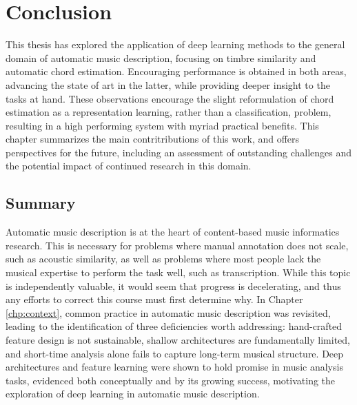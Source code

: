 \graphicspath{{8/figures/}}
\chapter{Conclusion}
\label{chp:conclusion}

This thesis has explored the application of deep learning methods to the general domain of automatic music description, focusing on timbre similarity and automatic chord estimation.
Encouraging performance is obtained in both areas, advancing the state of art in the latter, while providing deeper insight to the tasks at hand.
These observations encourage the slight reformulation of chord estimation as a representation learning, rather than a classification, problem, resulting in a high performing system with myriad practical benefits.
This chapter summarizes the main contritributions of this work, and offers perspectives for the future, including an assessment of outstanding challenges and the potential impact of continued research in this domain.

\section{Summary}

Automatic music description is at the heart of content-based music informatics research.
This is necessary for problems where manual annotation does not scale, such as acoustic similarity, as well as problems where most people lack the musical expertise to perform the task well, such as transcription.
While this topic is independently valuable, it would seem that progress is decelerating, and thus any efforts to correct this course must first determine why.
In Chapter \ref{chp:context}, common practice in automatic music description was revisited, leading to the identification of three deficiencies worth addressing:
hand-crafted feature design is not sustainable, shallow architectures are fundamentally limited, and short-time analysis alone fails to capture long-term musical structure.
Deep architectures and feature learning were shown to hold promise in music analysis tasks, evidenced both conceptually and by its growing success, motivating the exploration of deep learning in automatic music description.

